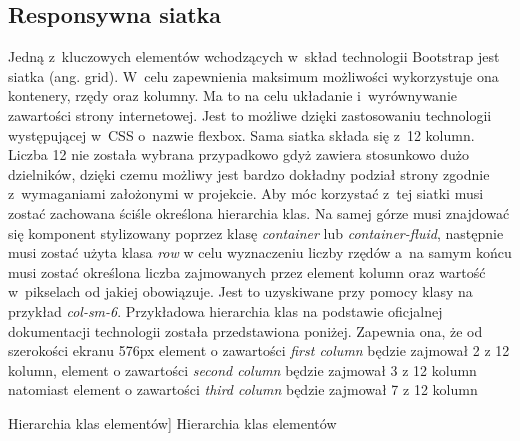 \documentclass[../Kamil_Kowalewski_Main.tex]{subfiles}
\begin{document}
{{        \subsection{Responsywna siatka}
        \label{chapter3:technologie:bootstrap:siatka} {
            Jedną z~kluczowych elementów wchodzących w~skład technologii Bootstrap jest
            siatka (ang. grid). W~celu zapewnienia maksimum możliwości wykorzystuje ona
            kontenery, rzędy oraz kolumny. Ma to na celu układanie i~wyrównywanie
            zawartości strony internetowej. Jest to możliwe dzięki zastosowaniu
            technologii występującej w~CSS o~nazwie flexbox. Sama siatka składa się
            z~12 kolumn. Liczba 12 nie została wybrana przypadkowo gdyż zawiera
            stosunkowo dużo dzielników, dzięki czemu możliwy jest bardzo dokładny
            podział strony zgodnie z~wymaganiami założonymi w projekcie. Aby móc
            korzystać z~tej siatki musi zostać zachowana ściśle określona hierarchia
            klas. Na samej górze musi znajdować się komponent stylizowany poprzez klasę
            \textit{container} lub \textit{container-fluid}, następnie musi zostać użyta
            klasa \textit{row} w celu wyznaczeniu liczby rzędów a~na samym końcu musi
            zostać określona liczba zajmowanych przez element kolumn oraz wartość
            w~pikselach od jakiej obowiązuje. Jest to uzyskiwane przy
            pomocy klasy na przykład \textit{col-sm-6}. Przykładowa hierarchia klas
            na podstawie oficjalnej dokumentacji technologii została przedstawiona poniżej.
            Zapewnia ona, że od szerokości ekranu 576px element o zawartości
            \textit{first column} będzie zajmował 2 z 12 kolumn, element o zawartości
            \textit{second column} będzie zajmował 3 z 12 kolumn natomiast element o zawartości
            \textit{third column} będzie zajmował 7 z 12 kolumn
            \begin{code}[H]
                
                \caption
                [Hierarchia klas elementów]
                {Hierarchia klas elementów}
                \label{chapter3:technologie:bootstrap:classes}
            \end{code}

}}}
\end{document}
